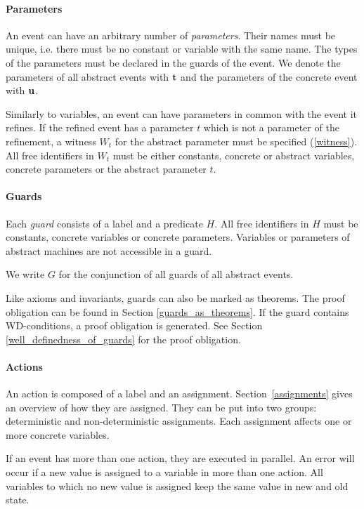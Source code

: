 \paragraph{Parameters}
\label{parameters}
An event can have an arbitrary number of \emph{parameters}. Their names must be unique, i.e. there must be no constant or variable with the same name.
The types of the parameters must be declared in the guards of the event.
We denote the parameters of all abstract events with $\mathbf{t}$ and the
parameters of the concrete event with $\mathbf{u}$.

Similarly to variables, an event can have parameters in common with the event it refines.
If the refined event has a parameter $t$ which is not a parameter of the refinement, 
 a witness $W_t$ for
 the abstract parameter must be specified (\ref{witness}).
All free identifiers in $W_t$ must be either constants, concrete or abstract variables, concrete
 parameters or the abstract parameter $t$.

\paragraph{Guards}
\label{guards}
Each \emph{guard} consists of a label and a predicate $H$.
All free identifiers in $H$ must be constants, concrete variables or concrete parameters.
Variables or parameters of abstract machines are not accessible in a guard.

We write $G$ for the conjunction of all guards of all abstract events.

Like axioms and invariants, guards can also be marked as theorems. 
The proof obligation can be found in Section \ref{guards_as_theorems}.
If the guard contains WD-conditions, a proof obligation is generated.
See Section \ref{well_definedness_of_guards} for the proof obligation.

\paragraph{Actions}
\label{actions}
An action is composed of a label and an assignment.
Section~\ref{assignments} gives an overview of how they are assigned.
They can be put into two groups: deterministic and non-deterministic assignments.
Each assignment affects one or more concrete variables.

If an event has more than one action, they are executed in parallel. 
An error will occur if a new value is assigned to a variable in more than one action.
All variables to which no new value is assigned keep the same value in new and old state.


